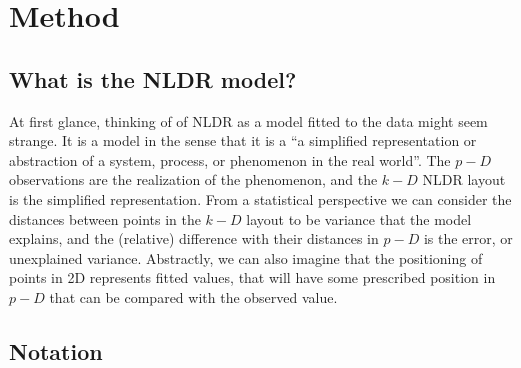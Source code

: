 \documentclass[
  12pt]{article}
\begin{document}
\section{Method}\label{sec-method}

\subsection{What is the NLDR model?}\label{what-is-the-nldr-model}

At first glance, thinking of of NLDR as a model fitted to the data might
seem strange. It is a model in the sense that it is a ``a simplified
representation or abstraction of a system, process, or phenomenon in the
real world''. The \(p-D\) observations are the realization of the
phenomenon, and the \(k-D\) NLDR layout is the simplified
representation. From a statistical perspective we can consider the
distances between points in the \(k-D\) layout to be variance that the
model explains, and the (relative) difference with their distances in
\(p-D\) is the error, or unexplained variance. Abstractly, we can also
imagine that the positioning of points in 2D represents fitted values,
that will have some prescribed position in \(p-D\) that can be compared
with the observed value.

\subsection{Notation}\label{notation}
\end{document}
